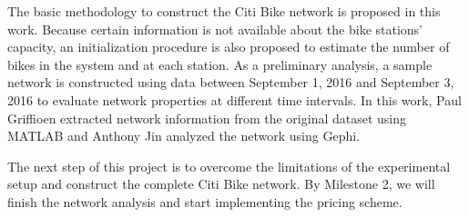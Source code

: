 \documentclass[times, 10pt,twocolumn]{article}
\begin{document}
The basic methodology to construct the Citi Bike network is proposed in this work. Because certain information is not available about the bike stations' capacity, an initialization procedure is also proposed to estimate the number of bikes in the system and at each station. As a preliminary analysis, a sample network is constructed using data between September 1, 2016 and September 3, 2016 to evaluate network properties at different time intervals. In this work, Paul Griffioen extracted network information from the original dataset using MATLAB and Anthony Jin analyzed the network using Gephi.

The next step of this project is to overcome the limitations of the experimental setup and construct the complete Citi Bike network. By Milestone 2, we will finish the network analysis and start implementing the pricing scheme. 

\newpage
\end{document}
